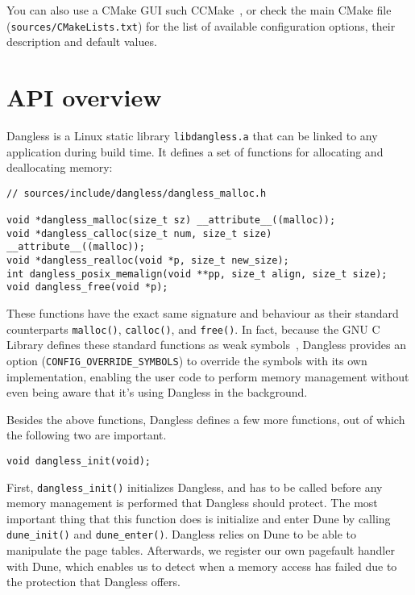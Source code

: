 You can also use a CMake GUI such CCMake~\cite{ccmake-website}, or check the main CMake file (\texttt{sources/CMakeLists.txt}) for the list of available configuration options, their description and default values.

\section{API overview}

Dangless is a Linux static library \texttt{libdangless.a} that can be linked to any application during build time. It defines a set of functions for allocating and deallocating memory:

\begin{lstlisting}
// sources/include/dangless/dangless_malloc.h

void *dangless_malloc(size_t sz) __attribute__((malloc));
void *dangless_calloc(size_t num, size_t size) __attribute__((malloc));
void *dangless_realloc(void *p, size_t new_size);
int dangless_posix_memalign(void **pp, size_t align, size_t size);
void dangless_free(void *p);
\end{lstlisting}

These functions have the exact same signature and behaviour as their standard counterparts \lstinline!malloc()!, \lstinline!calloc()!, and \lstinline!free()!. In fact, because the GNU C Library defines these standard functions as weak symbols~\cite{glibc-malloc-is-weak}, Dangless provides an option (\lstinline!CONFIG_OVERRIDE_SYMBOLS!) to override the symbols with its own implementation, enabling the user code to perform memory management without even being aware that it's using Dangless in the background.

Besides the above functions, Dangless defines a few more functions, out of which the following two are important.

\begin{lstlisting}
void dangless_init(void);
\end{lstlisting}

First, \lstinline!dangless_init()! initializes Dangless, and has to be called before any memory management is performed that Dangless should protect. The most important thing that this function does is initialize and enter Dune by calling \lstinline!dune_init()! and \lstinline!dune_enter()!. Dangless relies on Dune to be able to manipulate the page tables. Afterwards, we register our own pagefault handler with Dune, which enables us to detect when a memory access has failed due to the protection that Dangless offers.

